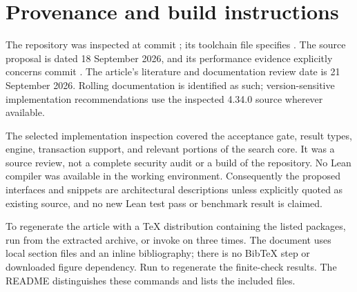 \section{Provenance and build instructions}\label{app:build}

The repository was inspected at commit ; its toolchain file specifies . The source proposal is dated 18 September 2026, and its performance evidence explicitly concerns commit . The article's literature and documentation review date is 21 September 2026. Rolling documentation is identified as such; version-sensitive implementation recommendations use the inspected 4.34.0 source wherever available.

The selected implementation inspection covered the acceptance gate, result types, engine, transaction support, and relevant portions of the search core. It was a source review, not a complete security audit or a build of the repository. No Lean compiler was available in the working environment. Consequently the proposed interfaces and snippets are architectural descriptions unless explicitly quoted as existing source, and no new Lean test pass or benchmark result is claimed.

To regenerate the article with a TeX distribution containing the listed packages, run  from the extracted archive, or invoke  on  three times. The document uses local section files and an inline bibliography; there is no BibTeX step or downloaded figure dependency. Run  to regenerate the finite-check results. The README distinguishes these commands and lists the included files.
